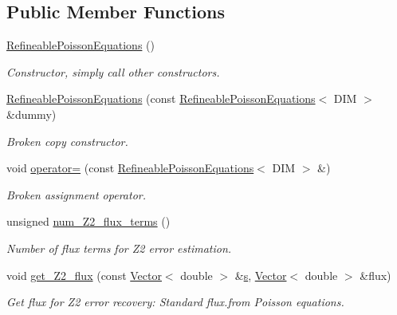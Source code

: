 \subsection*{Public Member Functions}
\begin{DoxyCompactItemize}
\item 
\hyperlink{classoomph_1_1RefineablePoissonEquations_acf636e8df990dace7887f67b04142391}{Refineable\+Poisson\+Equations} ()
\begin{DoxyCompactList}\small\item\em Constructor, simply call other constructors. \end{DoxyCompactList}\item 
\hyperlink{classoomph_1_1RefineablePoissonEquations_aa21dedcb00b52e0b564e275748baf7ed}{Refineable\+Poisson\+Equations} (const \hyperlink{classoomph_1_1RefineablePoissonEquations}{Refineable\+Poisson\+Equations}$<$ D\+IM $>$ \&dummy)
\begin{DoxyCompactList}\small\item\em Broken copy constructor. \end{DoxyCompactList}\item 
void \hyperlink{classoomph_1_1RefineablePoissonEquations_abacc091fa206b7a94fea160835ea3a62}{operator=} (const \hyperlink{classoomph_1_1RefineablePoissonEquations}{Refineable\+Poisson\+Equations}$<$ D\+IM $>$ \&)
\begin{DoxyCompactList}\small\item\em Broken assignment operator. \end{DoxyCompactList}\item 
unsigned \hyperlink{classoomph_1_1RefineablePoissonEquations_ab778ee621a1e0fc89f10533134a6f825}{num\+\_\+\+Z2\+\_\+flux\+\_\+terms} ()
\begin{DoxyCompactList}\small\item\em Number of \textquotesingle{}flux\textquotesingle{} terms for Z2 error estimation. \end{DoxyCompactList}\item 
void \hyperlink{classoomph_1_1RefineablePoissonEquations_a8050a73d9e6450e2b861b3d840f5f6ec}{get\+\_\+\+Z2\+\_\+flux} (const \hyperlink{classoomph_1_1Vector}{Vector}$<$ double $>$ \&\hyperlink{cfortran_8h_ab7123126e4885ef647dd9c6e3807a21c}{s}, \hyperlink{classoomph_1_1Vector}{Vector}$<$ double $>$ \&flux)
\begin{DoxyCompactList}\small\item\em Get \textquotesingle{}flux\textquotesingle{} for Z2 error recovery\+: Standard flux.\+from Poisson equations. \end{DoxyCompactList}\item 

\end{DoxyCompactItemize}

